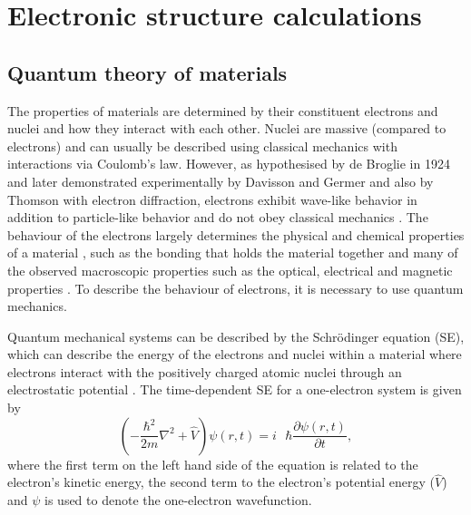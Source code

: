 \documentclass[11pt, twoside]{report}
\begin{document}
\section{Electronic structure calculations}\label{elec_struc}

\subsection{Quantum theory of materials}


The properties of materials are determined by their constituent electrons and nuclei and how they interact with each other. Nuclei are massive (compared to electrons) and can usually be described using classical mechanics with interactions via Coulomb's law. However, as hypothesised by de Broglie in 1924 and later demonstrated experimentally by Davisson and Germer and also by Thomson with electron diffraction, electrons exhibit wave-like behavior in addition to particle-like behavior and do not obey classical mechanics \cite{quantum_intro}. The behaviour of the electrons largely determines the physical and chemical properties of a material \cite{Prasad_ch2}, such as the bonding that holds the material together and many of the observed macroscopic properties such as the optical, electrical and magnetic properties \cite{RichardMartin_Ch1}. To describe the behaviour of electrons, it is necessary to use quantum mechanics.

Quantum mechanical systems can be described by the Schr{\"o}dinger equation (SE), which can describe the energy of the electrons and nuclei within a material where electrons interact with the positively charged atomic nuclei through an electrostatic potential \cite{Lesar}. The time-dependent SE for a one-electron system is given by
\begin{equation} \label{SE}
\left( - \frac{\hbar^2}{2m} \nabla^2 + \hat{V} \right)\psi(r,t) = i\text{ } \hbar\frac{\partial \psi(r,t)}{\partial t},
\end{equation}
where the first term on the left hand side of the equation is related to the electron's kinetic energy, the second term to the electron's potential energy ($\hat{V}$) and $\psi$ is used to denote the one-electron wavefunction.
\end{document}
